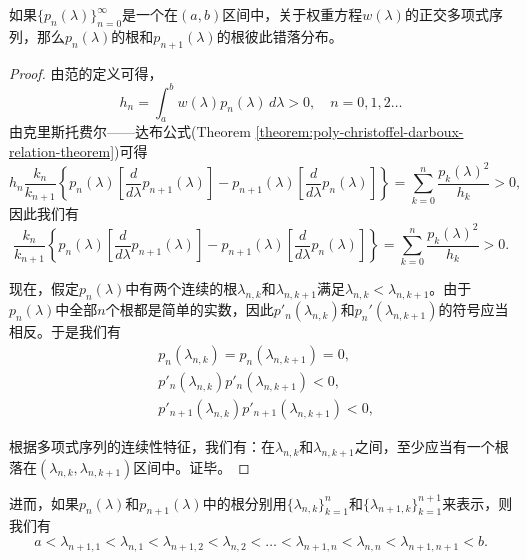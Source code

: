 \begin{subappendices}
\begin{theorem}
  如果$\{p_n(\lambda)\}_{n=0}^{\infty}$是一个在$(a,b)$区间中，关于权重方程$w(\lambda)$的正交多项式序列，那么$p_n(\lambda)$的根和$p_{n+1}(\lambda)$的根彼此错落分布。
\end{theorem}
\begin{proof}
  由范的定义可得，
  \begin{equation*}
    h_n = \int_a^b w(\lambda) p_n(\lambda) \, d \lambda >0, \quad n=0,1,2\ldots
  \end{equation*}
由克里斯托费尔——达布公式(Theorem \ref{theorem:poly-christoffel-darboux-relation-theorem})可得
\begin{equation*}
  h_n \frac{k_n}{k_{n+1}} \left\{ p_n(\lambda) \left[ \frac{d}{d \lambda} p_{n+1}(\lambda)\right]
  - p_{n+1}(\lambda) \left[ \frac{d}{d \lambda} p_{n}(\lambda) \right] \right\} = \sum_{k=0}^{n} \frac{p_k(\lambda)^2}{h_k} >0,
\end{equation*}
因此我们有
\begin{equation*}
  \frac{k_n}{k_{n+1}} \left\{p_n(\lambda) \left[ \frac{d}{d \lambda} p_{n+1}(\lambda)\right]
  - p_{n+1}(\lambda) \left[ \frac{d}{d \lambda} p_{n}(\lambda) \right] \right\} = \sum_{k=0}^{n} \frac{p_k(\lambda)^2}{h_k} >0.
\end{equation*}

现在，假定$p_n(\lambda)$中有两个连续的根$\lambda_{n,k}$和$\lambda_{n,k+1}$满足$\lambda_{n,k} < \lambda_{n,k+1}$。由于$p_n(\lambda)$中全部$n$个根都是简单的实数，因此$p'_n(\lambda_{n,k})$和$p_n'(\lambda_{n,k+1})$的符号应当相反。于是我们有
\begin{align*}
  &p_n(\lambda_{n,k}) = p_n(\lambda_{n,k+1}) = 0, \\
  &p'_n(\lambda_{n,k}) p'_{n}(\lambda_{n,k+1})<0, \\
  &p'_{n+1}(\lambda_{n,k}) p'_{n+1}(\lambda_{n,k+1})<0,
\end{align*}

根据多项式序列的连续性特征，我们有：在$\lambda_{n,k}$和$\lambda_{n,k+1}$之间，至少应当有一个根落在$(\lambda_{n,k},\lambda_{n,k+1})$区间中。证毕。
\end{proof}

进而，如果$p_n(\lambda)$和$p_{n+1}(\lambda)$中的根分别用$\{\lambda_{n,k}\}_{k=1}^{n}$和$\{\lambda_{n+1,k}\}_{k=1}^{n+1}$来表示，则我们有
\begin{equation*}
  a < \lambda_{n+1,1} < \lambda_{n,1} < \lambda_{n+1,2} < \lambda_{n,2} < \ldots < \lambda_{n+1,n} < \lambda_{n,n} < \lambda_{n+1,n+1} < b.
\end{equation*}


\end{subappendices}
